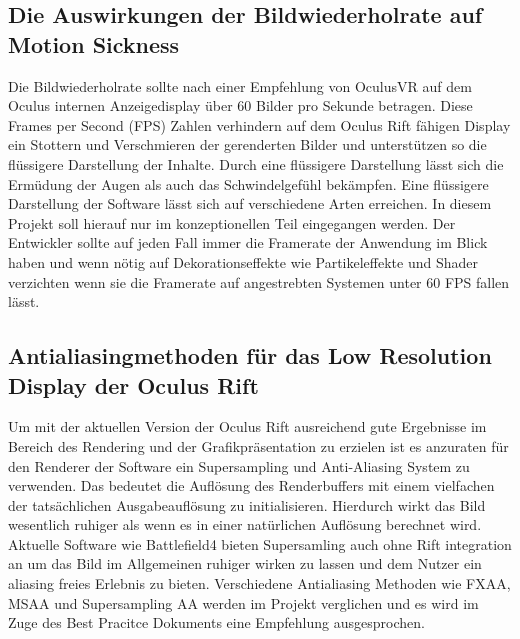 \documentclass[pagesize, paper=a4, fontsize=12pt,titlepage=true, headings=small, headnosepline, abstractoff, liststotoc, nochapterprefix, plainheadsepline]{scrreprt}
\begin{document}
\subsection{Die Auswirkungen der Bildwiederholrate auf Motion Sickness}
Die Bildwiederholrate sollte nach einer Empfehlung von OculusVR auf dem Oculus internen Anzeigedisplay über 60 Bilder pro Sekunde betragen. Diese Frames per Second (FPS) Zahlen verhindern auf dem Oculus Rift fähigen Display ein Stottern und Verschmieren der gerenderten Bilder und unterstützen so die flüssigere Darstellung der Inhalte. Durch eine flüssigere Darstellung lässt sich die Ermüdung der Augen als auch das Schwindelgefühl bekämpfen. Eine flüssigere Darstellung der Software lässt sich auf verschiedene Arten erreichen. In diesem Projekt soll hierauf nur im konzeptionellen Teil eingegangen werden. Der Entwickler sollte auf jeden Fall immer die Framerate der Anwendung im Blick haben und wenn nötig auf Dekorationseffekte wie Partikeleffekte und Shader verzichten wenn sie die Framerate auf angestrebten Systemen unter 60 FPS fallen lässt.

\subsection{Antialiasingmethoden für das Low Resolution Display der Oculus Rift}
Um mit der aktuellen Version der Oculus Rift ausreichend gute Ergebnisse im Bereich des Rendering und der Grafikpräsentation zu erzielen ist es anzuraten für den Renderer der Software ein Supersampling und Anti-Aliasing System zu verwenden. Das bedeutet die Auflösung des Renderbuffers mit einem vielfachen der tatsächlichen Ausgabeauflösung zu initialisieren. Hierdurch wirkt das Bild wesentlich ruhiger als wenn es in einer natürlichen Auflösung berechnet wird. Aktuelle Software wie Battlefield4 \cite{Battlefield42014} bieten Supersamling auch ohne Rift integration an um das Bild im Allgemeinen ruhiger wirken zu lassen und dem Nutzer ein aliasing freies Erlebnis zu bieten. Verschiedene Antialiasing Methoden wie FXAA, MSAA und Supersampling AA werden im Projekt verglichen und es wird im Zuge des Best Pracitce Dokuments eine Empfehlung ausgesprochen.
\end{document}
